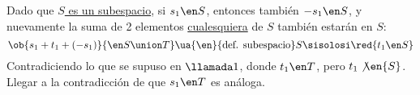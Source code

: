 \begin{itemize}
        Dado que \underline{$S$ es un subespacio}, si $s_1 \en S$, entonces también $-s_1 \en S$, y nuevamente la suma de 2 elementos
        \ul{cualesquiera} de $S$ también estarán en $S$:
        $$
          \ob{s_1 + t_1 + (-s_1)}{\en S \union T} \ua{\en}{\text{def. subespacio}} S
          \sisolosi
          \red{t_1 \en S}
        $$
        Contradiciendo lo que se supuso en $\llamada1$, donde $t_1 \en T$, pero $t_1 \not\en{S}$. Llegar a la contradicción de que $s_1 \en T$ es análoga.

\end{itemize}

\begin{aportes}
  \item {}
  \item {}
  \item {}
\end{aportes}
